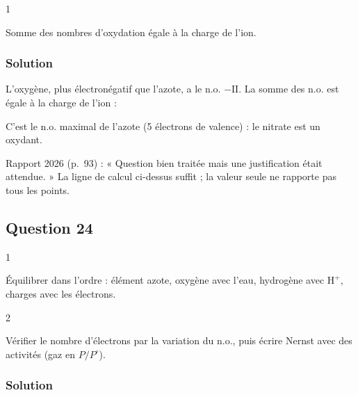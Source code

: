 \documentclass[11pt,a4paper]{article}
\newcommand{\equationajustee}[1]{%
  \sbox{\boiteequation}{$\displaystyle #1$}%
  \ifdim\wd\boiteequation>\linewidth
    \[\resizebox{\linewidth}{!}{\usebox{\boiteequation}}\]%
  \else
    \[#1\]%
  \fi}
\begin{document}
\begin{indication}{1}

Somme des nombres d'oxydation égale à la charge de l'ion.

\end{indication}

\hypertarget{solution-22}{%
\subsubsection{Solution}\label{solution-22}}

L'oxygène, plus électronégatif que l'azote, a le n.o. \(-\mathrm{II}\). La somme des n.o. est égale à la charge de l'ion :

\equationajustee{x+3(-\mathrm{II})=-\mathrm I}

\equationajustee{\boxed{\text{n.o.(N)}=+\mathrm V}}

C'est le n.o. maximal de l'azote (5 électrons de valence) : le nitrate est un oxydant.

\begin{jury}

Rapport 2026 (p.~93) : « Question bien traitée mais une justification était attendue. » La ligne de calcul ci-dessus suffit ; la valeur seule ne rapporte pas tous les points.

\end{jury}

\hypertarget{question-24}{%
\subsection{Question 24}\label{question-24}}

\begin{indication}{1}

Équilibrer dans l'ordre : élément azote, oxygène avec l'eau, hydrogène avec \(\mathrm{H^+}\), charges avec les électrons.

\end{indication}

\begin{indication}{2}

Vérifier le nombre d'électrons par la variation du n.o., puis écrire Nernst avec des activités (gaz en \(P/P^\circ\)).

\end{indication}

\hypertarget{solution-23}{%
\subsubsection{Solution}\label{solution-23}}
\end{document}
